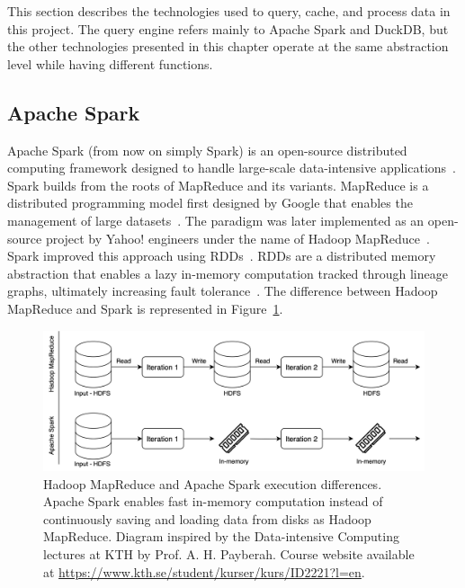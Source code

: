 This section describes the technologies used to query, cache, and process data in this project. The query engine refers mainly to Apache Spark and DuckDB, but the other technologies presented in this chapter operate at the same abstraction level while having different functions.

\subsection{Apache Spark}

Apache Spark (from now on simply Spark) is an open-source distributed computing framework designed to handle large-scale data-intensive applications~\cite{zahariaApacheSparkUnified2016}. Spark builds from the roots of MapReduce and its variants. MapReduce is a distributed programming model first designed by Google that enables the management of large datasets~\cite{dean2004mapreduce}. The paradigm was later implemented as an open-source project by Yahoo! engineers under the name of Hadoop MapReduce~\cite{borthakurHadoopDistributedFile2005}. Spark improved this approach using \glspl{RDD}~\cite{Zaharia:EECS-2011-82}. \glspl{RDD} are a distributed memory abstraction that enables a lazy in-memory computation tracked through lineage graphs, ultimately increasing fault tolerance~\cite{Zaharia:EECS-2011-82}. The difference between Hadoop MapReduce and Spark is represented in Figure~\ref{fig:MapReducevsSpark}.

\begin{figure}[!ht]
  \begin{center}
    \includegraphics[width=\textwidth]{figures/2-background/Spark_MapReduce.png}
  \end{center}
  \caption[Hadoop MapReduce vs. Apache Spark]{Hadoop MapReduce and Apache Spark execution differences. Apache Spark enables fast in-memory computation instead of continuously saving and loading data from disks as Hadoop MapReduce. Diagram inspired by the Data-intensive Computing lectures at KTH by Prof. A. H. Payberah. Course website available at \url{https://www.kth.se/student/kurser/kurs/ID2221?l=en}.}
  \label{fig:MapReducevsSpark}
\end{figure}

